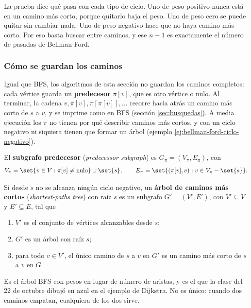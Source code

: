 \documentclass[11pt,letterpaper]{article}
\begin{document}
La prueba dice qué pasa con cada tipo de ciclo. Uno de peso positivo
nunca está en un camino más corto, porque quitarlo baja el peso. Uno
de peso cero se puede quitar sin cambiar nada. Uno de peso negativo
hace que no haya camino más corto. Por eso basta buscar entre
caminos, y ese $n - 1$ es exactamente el número de pasadas de
Bellman-Ford.

\subsubsection*{Cómo se guardan los caminos}

Igual que BFS, los algoritmos de esta sección no guardan los caminos
completos: cada vértice guarda un \textbf{predecesor} $\pi[v]$, que es
otro vértice o nulo. Al terminar, la cadena
$v, \pi[v], \pi[\pi[v]], \dots$ recorre hacia atrás un camino más
corto de $s$ a $v$, y se imprime como en BFS (sección
\ref{sec:busquedas}). A media ejecución los $\pi$ no tienen por qué
describir caminos más cortos, y con un ciclo negativo ni siquiera
tienen que formar un árbol (ejemplo
\ref{ej:bellman-ford-ciclo-negativo}).

\begin{definicion}
  \label{def:subgrafo-pred-fuente}
  El \textbf{subgrafo predecesor} (\textit{predecessor subgraph}) es
  $G_\pi = (V_\pi, E_\pi)$, con
  \[
    V_\pi = \set{v \in V : \pi[v] \neq \text{nulo}} \cup \set{s} ,
    \qquad
    E_\pi = \set{(\pi[v], v) : v \in V_\pi - \set{s}} .
  \]
\end{definicion}

\begin{definicion}
  \label{def:arbol-caminos-cortos}
  Si desde $s$ no se alcanza ningún ciclo negativo, un \textbf{árbol
  de caminos más cortos} (\textit{shortest-paths tree}) con raíz $s$
  es un subgrafo $G' = (V', E')$, con $V' \subseteq V$ y
  $E' \subseteq E$, tal que
  \begin{enumerate}[itemsep=0.1em]
    \item $V'$ es el conjunto de vértices alcanzables desde $s$;
    \item $G'$ es un árbol con raíz $s$;
    \item para todo $v \in V'$, el único camino de $s$ a $v$ en $G'$
          es un camino más corto de $s$ a $v$ en $G$.
  \end{enumerate}
\end{definicion}

Es el árbol BFS con pesos en lugar de número de aristas, y es el que
la clase del 22 de octubre dibujó en azul en el ejemplo de Dijkstra.
No es único: cuando dos caminos empatan, cualquiera de los dos sirve.
\end{document}

